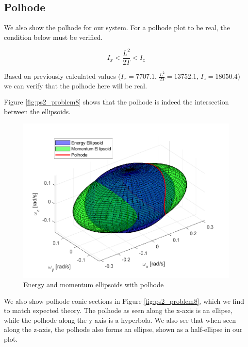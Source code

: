 \subsection{Polhode}
We also show the polhode for our system. For a polhode plot to be real, the condition below must be verified.

\begin{equation*}
    I_x < \frac{L^2}{2T} < I_z
\end{equation*}

Based on previously calculated values ($I_x = 7707.1$, $\frac{L^2}{2T} = 13752.1$, $I_z = 18050.4$) we can verify that the polhode here will be real.

Figure \ref{fig:ps2_problem8} shows that the polhode is indeed the intersection between the ellipsoids.

\begin{figure}[H]
\centering
\includegraphics[scale=0.65]{Images/ps2_problem7.png}
\caption{Energy and momentum ellipsoids with polhode}
\label{fig:ps2_problem7}
\end{figure}

We also show polhode conic sections in Figure \ref{fig:ps2_problem8}, which we find to match expected theory. The polhode as seen along the x-axis is an ellipse, while the polhode along the y-axis is a hyperbola. We also see that when seen along the z-axis, the polhode also forms an ellipse, shown as a half-ellipse in our plot.

